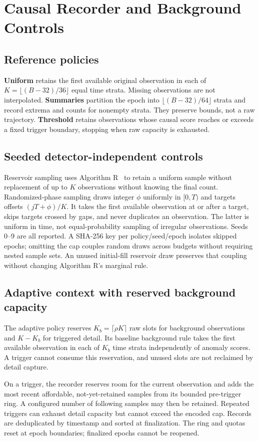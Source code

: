 \section{Causal Recorder and Background Controls}
\label{sec:method}
\subsection{Reference policies}
\textbf{Uniform} retains the first available original observation in each of
$K=\lfloor(B-32)/36\rfloor$ equal time strata. Missing observations are not
interpolated. \textbf{Summaries} partition the epoch into
$\lfloor(B-32)/64\rfloor$ strata and record extrema and counts for nonempty
strata. They preserve bounds, not a raw trajectory. \textbf{Threshold} retains
observations whose causal score reaches or exceeds a fixed trigger boundary,
stopping when raw capacity is exhausted.

\subsection{Seeded detector-independent controls}
Reservoir sampling uses Algorithm R~\citep{vitter1985reservoir} to retain a uniform
sample without replacement of up to $K$ observations without knowing the final
count. Randomized-phase sampling draws integer $\phi$ uniformly in $[0,T)$ and
targets offsets $(jT+\phi)/K$. It takes the first available observation at or after
a target, skips targets crossed by gaps, and never duplicates an observation.
The latter is uniform in time, not equal-probability sampling of irregular
observations. Seeds 0--9 are all reported. A SHA-256 key per policy/seed/epoch
isolates skipped epochs; omitting the cap couples random draws across budgets
without requiring nested sample sets. An unused initial-fill reservoir draw
preserves that coupling without changing Algorithm R's marginal rule.

\subsection{Adaptive context with reserved background capacity}
The adaptive policy reserves $K_b=\lceil\rho K\rceil$ raw slots for background
observations and $K-K_b$ for triggered detail. Its baseline background rule takes
the first available observation in each of $K_b$ time strata independently of
anomaly scores. A trigger cannot consume this reservation, and unused slots are
not reclaimed by detail capture.

On a trigger, the recorder reserves room for the current observation and adds
the most recent affordable, not-yet-retained samples from its bounded pre-trigger
ring. A configured number of following samples may then be retained. Repeated
triggers can exhaust detail capacity but cannot exceed the encoded cap. Records
are deduplicated by timestamp and sorted at finalization. The ring and quotas
reset at epoch boundaries; finalized epochs cannot be reopened.

